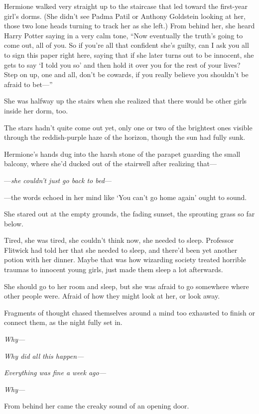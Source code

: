 Hermione walked very straight up to the staircase that led toward the first-year girl’s dorms. (She didn’t see Padma Patil or Anthony Goldstein looking at her, those two lone heads turning to track her as she left.) From behind her, she heard Harry Potter saying in a very calm tone, “Now eventually the truth’s going to come out, all of you. So if you’re all that confident she’s guilty, can I ask you all to sign this paper right here, saying that if she later turns out to be innocent, she gets to say ‘I told you so’ and then hold it over you for the rest of your lives? Step on up, one and all, don’t be cowards, if you really believe you shouldn’t be afraid to bet—”

She was halfway up the stairs when she realized that there would be other girls inside her dorm, too.

\later

The stars hadn’t quite come out yet, only one or two of the brightest ones visible through the reddish-purple haze of the horizon, though the sun had fully sunk.

Hermione’s hands dug into the harsh stone of the parapet guarding the small balcony, where she’d ducked out of the stairwell after realizing that—

—\emph{she couldn’t just go back to bed}—

—the words echoed in her mind like ‘You can’t go home again’ ought to sound.

She stared out at the empty grounds, the fading sunset, the sprouting grass so far below.

Tired, she was tired, she couldn’t think now, she needed to sleep. Professor Flitwick had told her that she needed to sleep, and there’d been yet another potion with her dinner. Maybe that was how wizarding society treated horrible traumas to innocent young girls, just made them sleep a lot afterwards.

She should go to her room and sleep, but she was afraid to go somewhere where other people were. Afraid of how they might look at her, or look away.

Fragments of thought chased themselves around a mind too exhausted to finish or connect them, as the night fully set in.

\emph{Why—}

\emph{Why did all this happen—}

\emph{Everything was fine a week ago—}

\emph{Why—}

From behind her came the creaky sound of an opening door.

